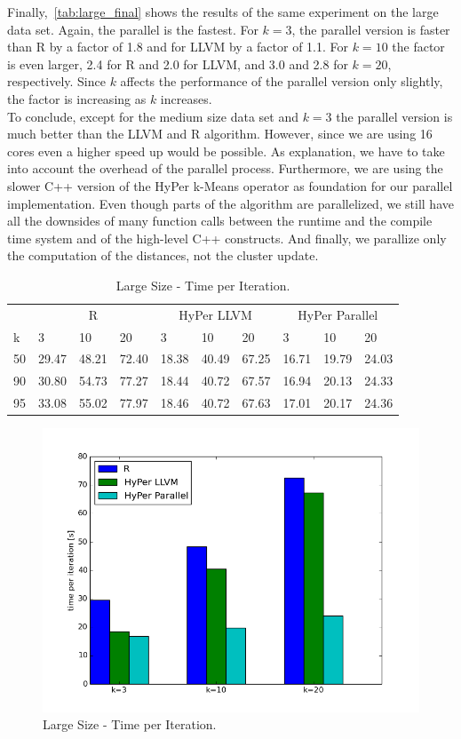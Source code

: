 Finally,~\autoref{tab:large_final} shows the results of the same experiment on the large data set. Again, the parallel is the fastest. For $k = 3$, the parallel version is faster than R by a factor of 1.8 and for LLVM by a factor of 1.1. For $k = 10$ the factor is even larger, 2.4 for R and 2.0 for LLVM, and 3.0 and 2.8 for $k = 20$, respectively. Since $k$ affects the performance of the parallel version only slightly, the factor is increasing as $k$ increases.
\\
To conclude, except for the medium size data set and $k = 3$ the parallel version is much better than the LLVM and R algorithm. However, since we are using 16 cores even a higher speed up would be possible. As explanation, we have to take into account the overhead of the parallel process. Furthermore, we are using the slower C++ version of the HyPer k-Means operator as foundation for our parallel implementation. Even though parts of the algorithm are parallelized, we still have all the downsides of many function calls between the runtime and the compile time system and of the high-level C++ constructs. And finally, we parallize only the computation of the distances, not the cluster update.


\begin{table}[htsb]
  \caption[Large Size - Time per Iteration]{Large Size - Time per Iteration.}
  \label{tab:large_final}
  \centering
  \begin{tabular}{l l l l l l l l l l }
    \toprule
      & \multicolumn{3}{c}{R} & \multicolumn{3}{c}{HyPer LLVM} & \multicolumn{3}{c}{HyPer Parallel}  \\
      k & 3 & 10 & 20 & 3 & 10 & 20 & 3 & 10 & 20 \\
    \midrule
      50  & 29.47 & 48.21 & 72.40 & 18.38 & 40.49 & 67.25 & 16.71 & 19.79 & 24.03 \\
      90  & 30.80 & 54.73 & 77.27 & 18.44 & 40.72 & 67.57 & 16.94 & 20.13 & 24.33 \\
      95  & 33.08 & 55.02 & 77.97 & 18.46 & 40.72 & 67.63 & 17.01 & 20.17 & 24.36 \\
    \bottomrule
  \end{tabular}
\end{table}




\begin{figure}[htsb]
  \centering
  \includegraphics[scale=0.4, trim="0cm 1.5cm 0cm 0cm"]{figures/charts/final_150M}
  \caption[Large Size - Time per Iteration]{Large Size - Time per Iteration.}
  \label{fig:final_150M}
\end{figure}


